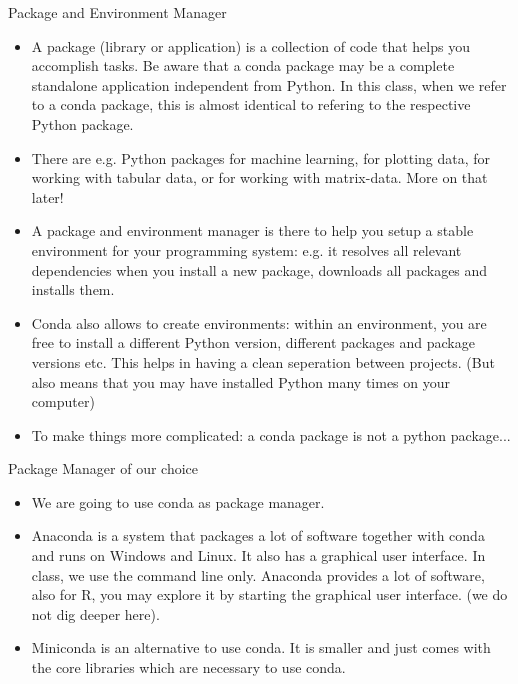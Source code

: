 \begin{frame}{Package and Environment Manager}
	\begin{itemize}
		
		\item A package (library or application) is a collection of code that helps you accomplish tasks. Be aware that a conda package may be a complete standalone application independent from Python. In this class, when we refer to a conda package, this is almost identical to refering to the respective Python package.
		\item There are e.g. Python packages for machine learning, for plotting data, for working with tabular data, or for working with matrix-data. More on that later! 
		\item A package and environment  manager is there to help you setup a stable environment for your programming system: e.g. it resolves all relevant dependencies when you install a new package, downloads all packages and installs them.
		\item Conda also allows to create environments: within an environment, you are free to install a different Python version, different packages and package versions etc. This helps in having a clean seperation between projects. (But also means that you may have installed Python many times on your computer)
		\item To make things more complicated: a conda package is not a python package...
	\end{itemize}
	
\end{frame}


\begin{frame}{Package Manager of our choice}
	
	\begin{itemize}
		\item We are going to use conda as package manager. 
		\item Anaconda is a system that packages a lot of software together with conda and runs on Windows and Linux. It also has a graphical user interface. In class, we use the command line only. Anaconda provides a lot of software, also for R, you may explore it by starting the graphical user interface. (we do not dig deeper here).
		\item Miniconda is an alternative to use conda. It is smaller and just comes with the core libraries which are necessary to use conda.
		
	\end{itemize}
	
	
\end{frame}

